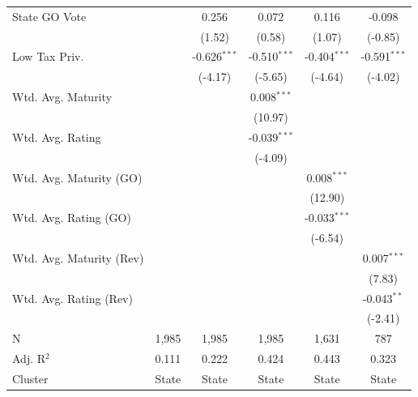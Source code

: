 \begin{tabular*}{\textwidth}{@{\extracolsep{\fill}}lccccc}
   State GO Vote              &              & 0.256          & 0.072          & 0.116          & -0.098\\   
                              &              & (1.52)        & (0.58)        & (1.07)        & (-0.85)\\   
   Low Tax Priv.              &              & -0.626$^{***}$ & -0.510$^{***}$ & -0.404$^{***}$ & -0.591$^{***}$\\   
                              &              & (-4.17)       & (-5.65)       & (-4.64)       & (-4.02)\\   
   Wtd. Avg. Maturity         &              &                & 0.008$^{***}$  &                &   \\   
                              &              &                & (10.97)       &                &   \\   
   Wtd. Avg. Rating           &              &                & -0.039$^{***}$ &                &   \\   
                              &              &                & (-4.09)       &                &   \\   
   Wtd. Avg. Maturity (GO)    &              &                &                & 0.008$^{***}$  &   \\   
                              &              &                &                & (12.90)       &   \\   
   Wtd. Avg. Rating (GO)      &              &                &                & -0.033$^{***}$ &   \\   
                              &              &                &                & (-6.54)       &   \\   
   Wtd. Avg. Maturity (Rev)   &              &                &                &                & 0.007$^{***}$\\   
                              &              &                &                &                & (7.83)\\   
   Wtd. Avg. Rating (Rev)     &              &                &                &                & -0.043$^{**}$\\   
                              &              &                &                &                & (-2.41)\\   
   \hline
   N               & 1,985        & 1,985          & 1,985          & 1,631          & 787\\  
   Adj. R$^2$             & 0.111        & 0.222          & 0.424          & 0.443          & 0.323\\  
   Cluster              & State & State & State & State & State\\  
   \bottomrule
\end{tabular*}
\par\endgroup
